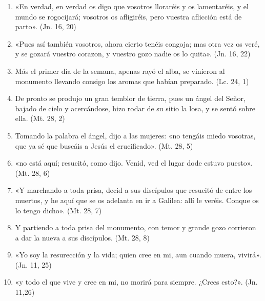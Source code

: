 \documentclass[a4paper,11pt]{article}
\begin{document}
      \begin{enumerate}
        
        \item «En verdad, en verdad os digo que vosotros lloraréis y os lamentaréis, y el mundo se rogocijará;
        vosotros os afligiréis, pero vuestra aflicción está de parto». (Jn. 16, 20)

        \item «Pues así también vosotros, ahora cierto tenéis congoja; mas otra vez os veré, y se gozará vuestro corazon,
        y vuestro gozo nadie os lo quita». (Jn. 16, 22)

        \item Más el primer día de la semana, apenas rayó el alba, se vinieron al monumento llevando consigo los aromas
        que habían preparado. (Lc. 24, 1)

        \item De pronto se produjo un gran temblor de tierra, pues un ángel del Señor, bajado de cielo y acercándose, hizo rodar
        de su sitio la losa, y se sentó sobre ella. (Mt. 28, 2)
        
        \item Tomando la palabra el ángel, dijo a las mujeres: «no tengáis miedo vosotras, que ya sé que buscáis a Jesús el crucificado». (Mt. 28, 5)

        \item «no está aquí; resucitó, como dijo. Venid, ved el lugar dode estuvo puesto». (Mt. 28, 6)

        \item «Y marchando a toda prisa, decid a sus discípulos que resucitó de entre los muertos, y he aquí que se os adelanta en ir a Galilea:
        allí le veréis. Conque os lo tengo dicho». (Mt. 28, 7)

        \item Y partiendo a toda prisa del monumento, con temor y grande gozo corrieron a dar la nueva a sus discípulos. (Mt. 28, 8)

        \item «Yo soy la resurección y la vida; quien cree en mi, aun cuando muera, vivirá». (Jn. 11, 25)

        \item «y todo el que vive y cree en mi, no morirá para siempre. ¿Crees esto?». (Jn. 11,26)
        
      \end{enumerate}
\end{document}
